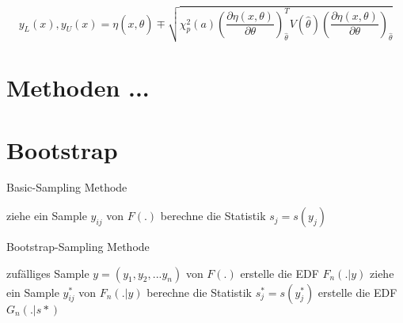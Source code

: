 \begin{equation}
y_L(x), y_U(x) = \eta(x, \hat\theta) \mp 
\sqrt{
  \chi_p^2(a)
  \left( 
    \frac{\partial\eta(x, \theta)}{\partial\theta} 
  \right)_{\hat\theta}^T 
  V(\hat\theta) 
  \left( 
    \frac{\partial\eta(x, \theta)}{\partial\theta} 
  \right)_{\hat\theta}
}
\end{equation}

\section{Methoden ...}

\section{Bootstrap}
\begin{algorithm} 
  \caption{Basic-Sampling Methode} 
  \label{algo:sampling} 

  \begin{algorithmic}
		    \STATE ziehe ein Sample $y_{ij}$ von $F(.)$
		  \ENDFOR
			\STATE berechne die Statistik $s_j = s(y_j)$
    \ENDFOR  
  \end{algorithmic}
\end{algorithm} 

\begin{algorithm} 
  \caption{Bootstrap-Sampling Methode} 
  \label{algo:bootstrap} 

  \begin{algorithmic}
    \REQUIRE zufälliges Sample $y = (y_1, y_2, ...y_n)$ von $F(.)$
    \STATE erstelle die EDF $F_n(.|y)$
			  \STATE ziehe ein Sample $y^*_{ij}$ von $F_n(.|y)$
			\ENDFOR
			\STATE berechne die Statistik $s^*_j = s(y^*_j)$
		\ENDFOR
		\STATE erstelle die EDF $G_n(.|s*)$ 
  \end{algorithmic}
\end{algorithm} 































